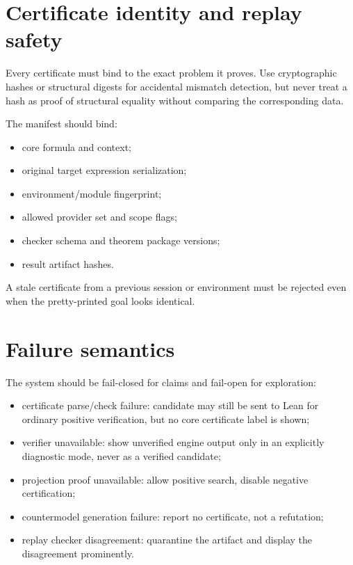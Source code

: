 \documentclass[11pt,letterpaper,openany]{report}
\theoremstyle{definition}
\theoremstyle{remark}
\begin{document}
\section{Certificate identity and replay safety}

Every certificate must bind to the exact problem it proves. Use cryptographic hashes or structural digests for accidental mismatch detection, but never treat a hash as proof of structural equality without comparing the corresponding data.

The manifest should bind:

\begin{itemize}
\item core formula and context;
\item original target expression serialization;
\item environment/module fingerprint;
\item allowed provider set and scope flags;
\item checker schema and theorem package versions;
\item result artifact hashes.
\end{itemize}

A stale certificate from a previous session or environment must be rejected even when the pretty-printed goal looks identical.

\section{Failure semantics}

The system should be fail-closed for claims and fail-open for exploration:

\begin{itemize}
\item certificate parse/check failure: candidate may still be sent to Lean for ordinary positive verification, but no core certificate label is shown;
\item verifier unavailable: show unverified engine output only in an explicitly diagnostic mode, never as a verified candidate;
\item projection proof unavailable: allow positive search, disable negative certification;
\item countermodel generation failure: report no certificate, not a refutation;
\item replay checker disagreement: quarantine the artifact and display the disagreement prominently.
\end{itemize}
\end{document}
